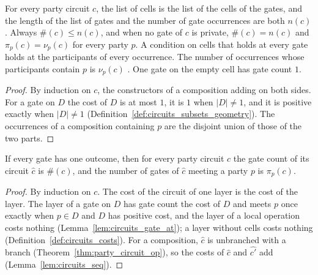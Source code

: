 \begin{theorem}
    \label{thm:party_gate_count_relations}
    \leanok
    For every party circuit $c$, the list of cells is the list of the cells of the
    gates, and the length of the list of gates and the number of gate occurrences are
    both $n(c)$. Always $\#(c)\le n(c)$, and when no gate of $c$ is private,
    $\#(c)=n(c)$ and $\pi_p(c)=\nu_p(c)$ for every party $p$. A condition on cells that
    holds at every gate holds at the participants of every occurrence. The number of
    occurrences whose participants contain $p$ is $\nu_p(c)$
    \cite[Section~5.1]{OpenAI2026PolynomialPEPS}. One gate on the empty cell has gate
    count $1$.
\end{theorem}
\begin{proof}\leanok
    By induction on $c$, the constructors of a composition adding on both sides. For a
    gate on $D$ the cost of $D$ is at most $1$, it is $1$ when $|D|\neq1$, and it is
    positive exactly when $|D|\neq1$ (Definition~\ref{def:circuits_subsets_geometry}).
    The occurrences of a composition containing $p$ are the disjoint union of those of
    the two parts.
\end{proof}

\begin{theorem}
    \label{thm:party_counts_circuit}
    \leanok
    If every gate has one outcome, then for every party circuit $c$ the gate count of
    its circuit $\widehat c$ is $\#(c)$, and the number of gates of $\widehat c$
    meeting a party $p$ is $\pi_p(c)$.
\end{theorem}
\begin{proof}\leanok
    By induction on $c$. The cost of the circuit of one layer is the cost of the
    layer. The layer of a gate on $D$ has gate count the cost of $D$ and meets $p$ once
    exactly when $p\in D$ and $D$ has positive cost, and the layer of a local operation
    costs nothing (Lemma~\ref{lem:circuits_gate_at}); a layer without cells costs
    nothing (Definition~\ref{def:circuits_costs}). For a composition, $\widehat c$ is
    unbranched with a branch (Theorem~\ref{thm:party_circuit_op}), so the costs of
    $\widehat c$ and $\widehat{c'}$ add (Lemma~\ref{lem:circuits_seq}).
\end{proof}

